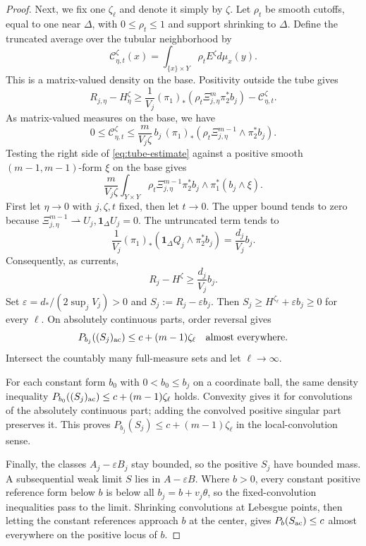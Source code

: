\documentclass[reqno]{amsart}
\theoremstyle{remark}
\theoremstyle{plain}
\begin{document}
\begin{proof}
Next, we fix one $\zeta_\ell$ and denote it simply by $\zeta$. Let \(\rho_t\) be smooth cutoffs, equal to one near \(\Delta\), with \(0\le\rho_t\le1\) and support shrinking to \(\Delta\). Define the truncated average over the tubular neighborhood by
\[
\mathcal C_{\eta,t}^\zeta(x)
=\int_{\{x\}\times Y}\rho_t E^\zeta d\mu_x(y).
\]
This is a matrix-valued density on the base. Positivity outside the tube gives
\[
R_{j,\eta}-H_\eta^\zeta\ge
\frac1{V_j}(\pi_1)_*(\rho_t\Xi_{j,\eta}^m\pi_2^*b_j)
-\mathcal C_{\eta,t}^\zeta.
\]
As matrix-valued measures on the base, we have
\begin{equation}\label{eq:tube-estimate}
0\le\mathcal C_{\eta,t}^\zeta
\le\frac{m}{V_j\zeta}\,b_j\,(\pi_1)_*
(\rho_t\Xi_{j,\eta}^{m-1}\wedge\pi_2^*b_j).
\end{equation}
 Testing the right side of \eqref{eq:tube-estimate} against a positive smooth \((m-1,m-1)\)-form \(\xi\) on the base gives
\[
\frac{m}{V_j\zeta}\int_{Y\times Y}
\rho_t\Xi_{j,\eta}^{m-1}\pi_2^*b_j\wedge\pi_1^*(b_j\wedge\xi).
\]
First let \(\eta\to0\) with \(j,\zeta,t\) fixed, then let \(t\to0\). The upper bound tends to zero because \(\Xi_{j,\eta}^{m-1}\rightharpoonup U_j, \mathbf1_\Delta U_j=0\). The untruncated term tends to
\[
\frac1{V_j}(\pi_1)_*(\mathbf1_\Delta Q_j\wedge\pi_2^*b_j)
=\frac{d_j}{V_j}b_j.
\]
Consequently, as currents,
\begin{equation}\label{eq:subtraction}
R_j-H^\zeta\ge\frac{d_j}{V_j}b_j.
\end{equation}
Set \(\varepsilon=d_*/(2\sup_jV_j)>0\) and \(S_j:=R_j-\varepsilon b_j\). Then \(S_j\ge H^{\zeta_\ell}+\varepsilon b_j\ge0\) for every \(\ell\). On absolutely continuous parts, order reversal gives
\[
P_{b_j}((S_j)_{\rm ac})\le c+(m-1)\zeta_\ell \quad \text{almost everywhere.}
\]
Intersect the countably many full-measure sets and let \(\ell\to\infty\).

For each constant form $b_0$ with \(0<b_0\leq b_j\)  on a coordinate ball, the same density inequality $P_{b_0}((S_j)_{\rm ac})\leq c+(m-1)\zeta_\ell$ holds. Convexity gives it for convolutions of the absolutely continuous part; adding the convolved positive singular part preserves it. This proves $P_{b_j}(S_j)\leq c+(m-1)\zeta_\ell$ in the local-convolution sense.

Finally, the classes \(A_j-\varepsilon B_j\) stay bounded, so the positive \(S_j\) have bounded mass. A subsequential weak limit \(S\) lies in \(A-\varepsilon B\). Where \(b>0\), every constant positive reference form below \(b\) is below all \(b_j=b+v_j\theta\), so the fixed-convolution inequalities pass to the limit. Shrinking convolutions at Lebesgue points, then letting the constant references approach \(b\) at the center, gives \(P_b(S_{\rm ac})\le c\) almost everywhere on the positive locus of \(b\).
\end{proof}
\end{document}
